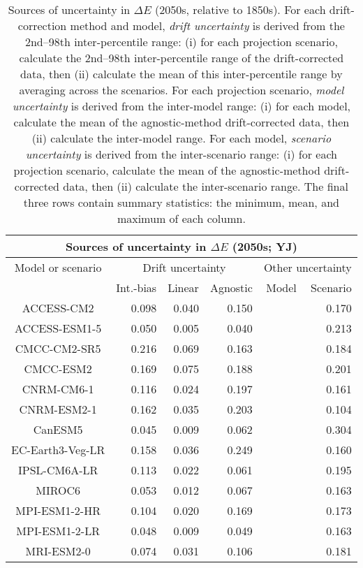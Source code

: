 \begin{table*}[t]
\centering
\caption{Sources of uncertainty in $\Delta E$ (2050s, relative to 1850s). For each drift-correction method and model, \emph{drift uncertainty} is derived from the 2nd--98th inter-percentile range: (i) for each projection scenario, calculate the 2nd--98th inter-percentile range of the drift-corrected data, then (ii) calculate the mean of this inter-percentile range by averaging across the scenarios. For each projection scenario, \emph{model uncertainty} is derived from the inter-model range: (i) for each model, calculate the mean of the agnostic-method drift-corrected data, then (ii) calculate the inter-model range. For each model, \emph{scenario uncertainty} is derived from the inter-scenario range: (i) for each projection scenario, calculate the mean of the agnostic-method drift-corrected data, then (ii) calculate the inter-scenario range. The final three rows contain summary statistics: the minimum, mean, and maximum of each column.}
\begin{tabular}{c|rrr|rr}
\toprule
\multicolumn{6}{c}{Sources of uncertainty in $\Delta E$ (2050s; YJ)} \\ 
\midrule
Model or scenario & \multicolumn{3}{c|}{Drift uncertainty} & \multicolumn{2}{c}{Other uncertainty} \\
 & Int.-bias & Linear & Agnostic & Model & Scenario \\
\midrule
ACCESS-CM2 & 0.098 & 0.040 & 0.150 &  & 0.170 \\
ACCESS-ESM1-5 & 0.050 & 0.005 & 0.040 &  & 0.213 \\
CMCC-CM2-SR5 & 0.216 & 0.069 & 0.163 &  & 0.184 \\
CMCC-ESM2 & 0.169 & 0.075 & 0.188 &  & 0.201 \\
CNRM-CM6-1 & 0.116 & 0.024 & 0.197 &  & 0.161 \\
CNRM-ESM2-1 & 0.162 & 0.035 & 0.203 &  & 0.104 \\
CanESM5 & 0.045 & 0.009 & 0.062 &  & 0.304 \\
EC-Earth3-Veg-LR & 0.158 & 0.036 & 0.249 &  & 0.160 \\
IPSL-CM6A-LR & 0.113 & 0.022 & 0.061 &  & 0.195 \\
MIROC6 & 0.053 & 0.012 & 0.067 &  & 0.163 \\
MPI-ESM1-2-HR & 0.104 & 0.020 & 0.169 &  & 0.173 \\
MPI-ESM1-2-LR & 0.048 & 0.009 & 0.049 &  & 0.163 \\
MRI-ESM2-0 & 0.074 & 0.031 & 0.106 &  & 0.181 \\

\end{tabular}
\end{table*}
